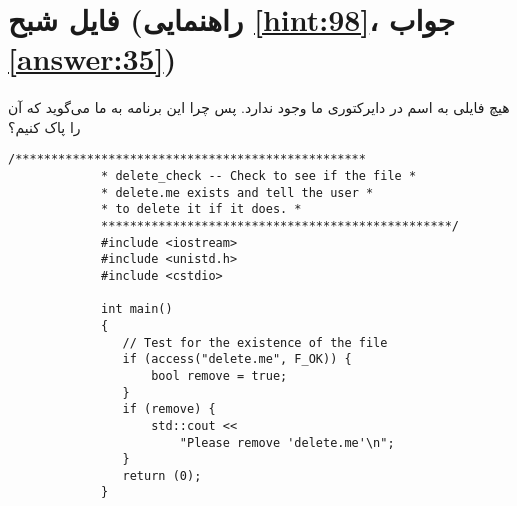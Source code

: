\section[فایل شبح]{فایل شبح \protect{} (راهنمایی \ref{hint:98}، جواب \ref{answer:35})}
\paragraph{}\label{prog:99}
هیچ فایلی به اسم  در دایرکتوری ما وجود ندارد. پس چرا این برنامه به ما می‌گوید که آن را پاک کنیم؟

\begin{LTR}
        \begin{lstlisting}[style=C++Style]
             /*************************************************
             * delete_check -- Check to see if the file *
             * delete.me exists and tell the user *
             * to delete it if it does. *
             *************************************************/
             #include <iostream>
             #include <unistd.h>
             #include <cstdio>

             int main()
             {
             	// Test for the existence of the file
             	if (access("delete.me", F_OK)) {
             		bool remove = true;
             	}
             	if (remove) {
             		std::cout <<
             			"Please remove 'delete.me'\n";
             	}
             	return (0);
             }
        \end{lstlisting}
\end{LTR}